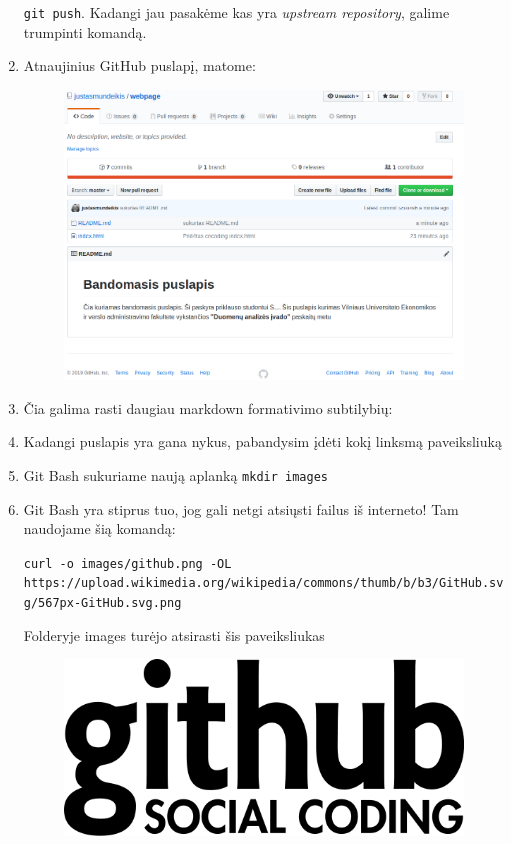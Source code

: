 \documentclass[12pt,a4paper]{article}
\begin{document}
\begin{enumerate}
\colorbox{listinggray}{\lstinline|git push|}. Kadangi jau pasakėme kas yra \textit{upstream repository}, galime trumpinti komandą.

\item Atnaujinius GitHub puslapį, matome:

\begin{figure}[H]
\center
\includegraphics[scale=0.4]{webpage_8.png}
\end{figure}



\item Čia galima rasti daugiau markdown formativimo subtilybių: \href{https://guides.github.com/pdfs/markdown-cheatsheet-online.pdf}{\color{blue}{Markdown cheetsheat link}}

\item Kadangi puslapis yra gana nykus, pabandysim įdėti kokį linksmą paveiksliuką

\item Git Bash sukuriame naują aplanką \colorbox{listinggray}{\lstinline|mkdir images|}
\item Git Bash yra stiprus tuo, jog gali netgi atsiųsti failus iš interneto! Tam naudojame šią komandą: 

\colorbox{listinggray}{\lstinline|curl -o images/github.png -OL https://upload.wikimedia.org/wikipedia/commons/thumb/b/b3/GitHub.svg/567px-GitHub.svg.png
|}

Folderyje images turėjo atsirasti šis paveiksliukas

\begin{figure}[H]
\center
\includegraphics[scale=0.2]{github.png}
\end{figure}


\end{enumerate}
\end{document}
